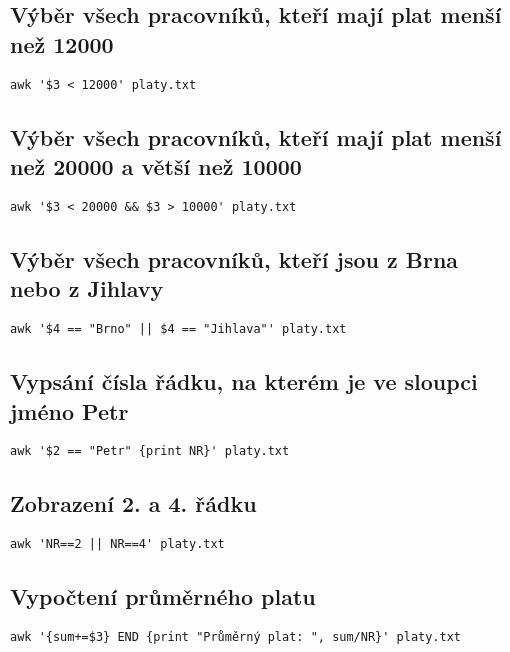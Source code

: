 \documentclass{article}
\begin{document}
\subsection{Výběr všech pracovníků, kteří mají plat menší než 12000}

\begin{lstlisting}
awk '$3 < 12000' platy.txt
\end{lstlisting}

\subsection{Výběr všech pracovníků, kteří mají plat menší než 20000 a větší než 10000}

\begin{lstlisting}
awk '$3 < 20000 && $3 > 10000' platy.txt
\end{lstlisting}

\subsection{Výběr všech pracovníků, kteří jsou z Brna nebo z Jihlavy}

\begin{lstlisting}
awk '$4 == "Brno" || $4 == "Jihlava"' platy.txt
\end{lstlisting}

\subsection{Vypsání čísla řádku, na kterém je ve sloupci jméno Petr}

\begin{lstlisting}
awk '$2 == "Petr" {print NR}' platy.txt
\end{lstlisting}

\subsection{Zobrazení 2. a 4. řádku}

\begin{lstlisting}
awk 'NR==2 || NR==4' platy.txt
\end{lstlisting}

\subsection{Vypočtení průměrného platu}

\begin{lstlisting}
awk '{sum+=$3} END {print "Průměrný plat: ", sum/NR}' platy.txt
\end{lstlisting}
\end{document}
